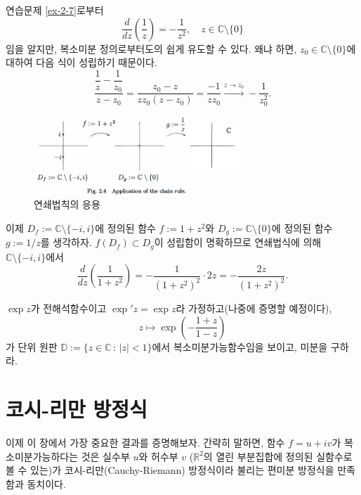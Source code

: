 \begin{salt_example}\label{example-2-4}
연습문제 \ref{ex-2-7}로부터
\[
\dfrac d{dz} \left(\dfrac 1z \right) = - \dfrac 1{z^2}, \quad
z\in \mathbb C \setminus \{0\}
\]
임을 알지만, 복소미분 정의로부터도의 쉽게 유도할 수 있다. 왜냐 하면,
$z_0\in \mathbb C \setminus \{0\}$에 대하여 다음 식이 성립하기 때문이다.
\[
\dfrac{\dfrac 1z - \dfrac1{z_0}}{z-z_0} = \dfrac{z_0 - z}{zz_0(z-z_0)}
= \dfrac{-1}{zz_0} \stackrel{z\to z_0}{\longrightarrow} - \dfrac 1{z_0^2}.
\] 
\begin{figure}[!h]
\begin{center}
\includegraphics[width=0.7\textwidth]{./SaltChapter/fig-2-4}
\end{center}
\caption{연쇄법칙의 응용}
\label{fig-2-4}
\end{figure}
이제 $D_f:=\mathbb C \setminus \{-i,i\}$에 정의된 함수 $f:= 1+z^2$와
$D_g:=\mathbb C \setminus \{0\}$에 정의된 함수 $g:=1/z$를 생각하자.
$f(D_f) \subset D_g$이 성립함이 명확하므로 연쇄법식에 의해
$\mathbb C \setminus \{-i, i\}$에서
\[
\dfrac d{dz} \left( \dfrac 1{1+z^2} \right) = - \dfrac 1{(1+z^2)^2}\cdot 2z
= - \dfrac{2z}{(1+z^2)^2}.
\]
\end{salt_example}

\begin{salt_exercise} \label{ex-2-8}
$\exp z$가 전해석함수이고 $\exp' z = \exp z$라 가정하고(나중에 증명할 예정이다),
\[
z \mapsto \exp \left( - \dfrac{1+z}{1-z} \right)
\]
가 단위 원판 $\mathbb D := \{ z \in \mathbb C \,:\, |z|<1 \}$에서
복소미분가능함수임을 보이고, 미분을 구하라.
\end{salt_exercise}

\section{코시-리만 방정식}

이제 이 장에서 가장 중요한 결과를 증명해보자.
간략히 말하면, 함수  $f=u+iv$가 복소미분가능하다는 것은
실수부 $u$와 허수부 $v$ ($\mathbb R^2$의 열린 부분집합에 정의된 실함수로 볼 수 있는)가
코시-리만(Cauchy-Riemann) 방정식이라 불리는 편미분 방정식을 만족함과 동치이다. 

